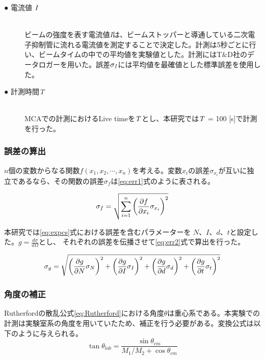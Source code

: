 \documentclass[a4paper,11pt,dvipdfmx]{jsarticle}
\begin{document}
\begin{description}
  \item[● 電流値 ${\it I}$]\mbox{}\\
   ビームの強度を表す電流値{\it I}は、ビームストッパーと導通している二次電子抑制管に流れる電流値を測定することで決定した。計測は5秒ごとに行い、ビームタイムの中での平均値を実験値とした。計測にはT\&D社のデータロガーを用いた。誤差${\it \sigma_I}$には平均値を最確値とした標準誤差を使用した。\\
  
  \item[● 計測時間{\it T}]\mbox{}\\
   MCAでの計測におけるLive timeを${\it T}$とし、本研究では${\it T}$ = 100 [s]で計測を行った。\\
\end{description}

\newpage
\subsubsection{誤差の算出}
$n$個の変数からなる関数$f(x_1,x_2,\cdots,x_n)$を考える。変数${ x_i}$の誤差$\sigma_{x_i}$が互いに独立であるなら、その関数の誤差$\sigma_f$は\eqref{eq:err1}式のように表される。

\begin{equation}
\centering
\sigma_f = \sqrt{\sum_{i=1}^{n} \left(\frac{\partial f}{\partial x_i} {\sigma_{x_i}}\right)^2}
\label{eq:err1}
\end{equation}

\noindent
本研究では\eqref{eq:expcs}式における誤差を含むパラメーターを $N$、$I$、$d$、$t$と設定した。$g = \frac{d\sigma}{d\Omega}$とし、
それぞれの誤差を伝播させて\eqref{eq:err2}式で算出を行った。

\begin{equation}
\centering
\sigma_g = \sqrt{ \left(\frac{\partial g}{\partial N} {\sigma_N }\right)^2 + \left(\frac{\partial g}{\partial I} {\sigma_I }\right)^2 + \left(\frac{\partial g}{\partial d} {\sigma_d }\right)^2 + \left(\frac{\partial g}{\partial t} {\sigma_t }\right)^2}
\label{eq:err2}
\end{equation}


\subsubsection{角度の補正}
Rutherfordの散乱公式\eqref{eq:Rutherford}における角度$\theta$は重心系である。本実験での計測は実験室系の角度を用いていたため、補正を行う必要がある。変換公式は以下のように与えられる。
\begin{equation}
    \tan \theta_{lab} = \frac{\sin \theta_{cm}}{M_1/M_2 + \cos {\theta_{cm}}}
\end{equation}
\end{document}
